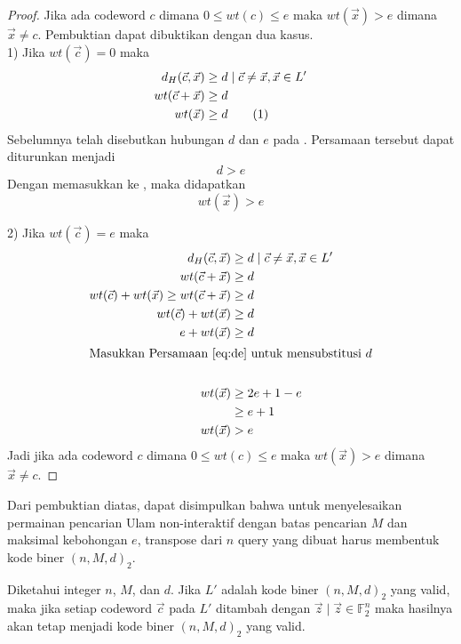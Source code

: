 \begin{proof}
Jika ada codeword $c$ dimana $0 \le wt(c) \le e$ maka $wt(\vec{x}) > e$ dimana $\vec{x} \neq c$. Pembuktian dapat dibuktikan dengan dua kasus.\\

1) Jika $wt(\vec{c}) = 0$ maka
\begin{align*}
d_H(\vec{c},\vec{x}) &\ge d \mid \vec{c} \neq \vec{x} , \vec{x} \in L' \\
wt(\vec{c} + \vec{x}) &\ge d \\
wt(\vec{x}) &\ge d \label{eq:proofd} \stepcounter{equation} \tag{\theequation}
\end{align*}
Sebelumnya telah disebutkan hubungan $d$ dan $e$ pada . Persamaan tersebut dapat diturunkan menjadi
\begin{equation} \label{eq:dge}
d > e
\end{equation}
Dengan memasukkan  ke , maka didapatkan
\begin{equation*}
wt(\vec{x}) > e
\end{equation*}

2) Jika $wt(\vec{c}) = e$ maka
\begin{align*}
d_H(\vec{c},\vec{x}) &\ge d \mid \vec{c} \neq \vec{x} , \vec{x} \in L' \\
wt(\vec{c}+\vec{x}) &\ge d \\
wt(\vec{c}) + wt(\vec{x}) \ge wt(\vec{c}+\vec{x}) &\ge d \\
wt(\vec{c}) + wt(\vec{x}) &\ge d \\
e + wt(\vec{x}) &\ge d \\
\intertext{Masukkan \refeq{eq:de} untuk mensubstitusi $d$}\\
wt(\vec{x}) &\ge 2e+1-e \\
&\ge e+1\\
wt(\vec{x}) &> e
\end{align*}
Jadi jika ada codeword $c$ dimana $0 \le wt(c) \le e$ maka $wt(\vec{x}) > e$ dimana $\vec{x} \neq c$.
\end{proof}

Dari pembuktian diatas, dapat disimpulkan bahwa untuk menyelesaikan permainan pencarian Ulam non-interaktif dengan batas pencarian $M$ dan maksimal kebohongan $e$, transpose dari $n$ query yang dibuat harus membentuk kode biner $(n,M,d)_2$.

\begin{lemma}
Diketahui integer $n$, $M$, dan $d$. Jika $L'$ adalah kode biner $(n,M,d)_2$ yang valid, maka jika setiap codeword $\vec{c}$ pada $L'$ ditambah dengan $\vec{z} \mid \vec{z} \in \mathbb{F}_2^n$ maka hasilnya akan tetap menjadi kode biner $(n,M,d)_2$ yang valid.  
\end{lemma}

